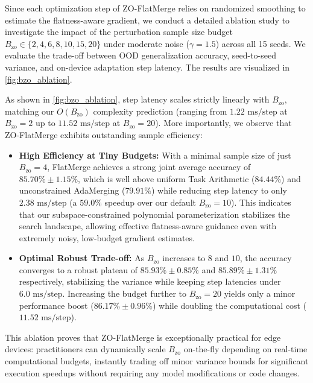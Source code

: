 Since each optimization step of ZO-FlatMerge relies on randomized smoothing to estimate the flatness-aware gradient, we conduct a detailed ablation study to investigate the impact of the perturbation sample size budget $B_{\text{zo}} \in \{2, 4, 6, 8, 10, 15, 20\}$ under moderate noise ($\gamma=1.5$) across all 15 seeds. 
We evaluate the trade-off between OOD generalization accuracy, seed-to-seed variance, and on-device adaptation step latency. 
The results are visualized in \cref{fig:bzo_ablation}.

As shown in \cref{fig:bzo_ablation}, step latency scales strictly linearly with $B_{\text{zo}}$, matching our $O(B_{\text{zo}})$ complexity prediction (ranging from $1.22\text{ ms/step}$ at $B_{\text{zo}}=2$ up to $11.52\text{ ms/step}$ at $B_{\text{zo}}=20$). 
More importantly, we observe that ZO-FlatMerge exhibits outstanding sample efficiency:
\begin{itemize}
    \item \textbf{High Efficiency at Tiny Budgets:} With a minimal sample size of just $B_{\text{zo}} = 4$, FlatMerge achieves a strong joint average accuracy of $85.70\% \pm 1.15\%$, which is well above uniform Task Arithmetic ($84.44\%$) and unconstrained AdaMerging ($79.91\%$) while reducing step latency to only $2.38\text{ ms/step}$ (a $59.0\%$ speedup over our default $B_{\text{zo}}=10$). This indicates that our subspace-constrained polynomial parameterization stabilizes the search landscape, allowing effective flatness-aware guidance even with extremely noisy, low-budget gradient estimates.
    \item \textbf{Optimal Robust Trade-off:} As $B_{\text{zo}}$ increases to $8$ and $10$, the accuracy converges to a robust plateau of $85.93\% \pm 0.85\%$ and $85.89\% \pm 1.31\%$ respectively, stabilizing the variance while keeping step latencies under $6.0\text{ ms/step}$. Increasing the budget further to $B_{\text{zo}} = 20$ yields only a minor performance boost ($86.17\% \pm 0.96\%$) while doubling the computational cost ($11.52\text{ ms/step}$).
\end{itemize}
This ablation proves that ZO-FlatMerge is exceptionally practical for edge devices: practitioners can dynamically scale $B_{\text{zo}}$ on-the-fly depending on real-time computational budgets, instantly trading off minor variance bounds for significant execution speedups without requiring any model modifications or code changes.

